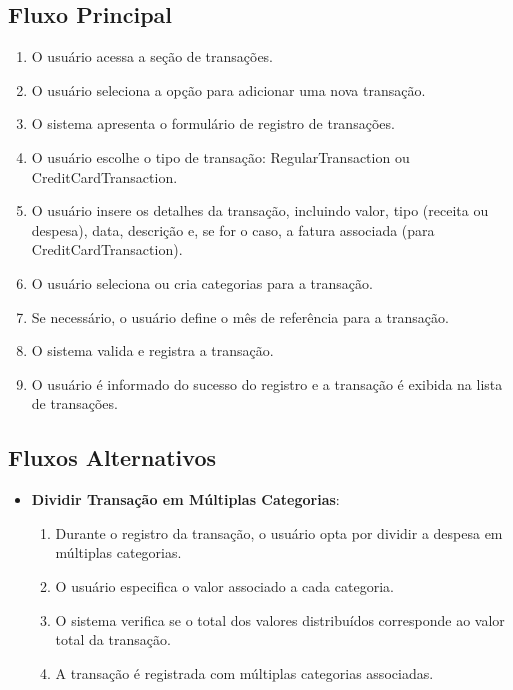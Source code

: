 \subsection*{Fluxo Principal}
\begin{addmargin}[1.5cm]{0cm}
	\begin{enumerate}
		\item O usuário acessa a seção de transações.
		\item O usuário seleciona a opção para adicionar uma nova transação.
		\item O sistema apresenta o formulário de registro de transações.
		\item O usuário escolhe o tipo de transação: RegularTransaction ou CreditCardTransaction.
		\item O usuário insere os detalhes da transação, incluindo valor, tipo (receita ou despesa), data, descrição e, se for o caso, a fatura associada (para CreditCardTransaction).
		\item O usuário seleciona ou cria categorias para a transação.
		\item Se necessário, o usuário define o mês de referência para a transação.
		\item O sistema valida e registra a transação.
		\item O usuário é informado do sucesso do registro e a transação é exibida na lista de transações.
	\end{enumerate}
\end{addmargin}

\subsection*{Fluxos Alternativos}
\begin{addmargin}[1.5cm]{0cm}
	\begin{itemize}
		\item \textbf{Dividir Transação em Múltiplas Categorias}:
		      \begin{enumerate}
			      \item Durante o registro da transação, o usuário opta por dividir a despesa em múltiplas categorias.
			      \item O usuário especifica o valor associado a cada categoria.
			      \item O sistema verifica se o total dos valores distribuídos corresponde ao valor total da transação.
			      \item A transação é registrada com múltiplas categorias associadas.
		      \end{enumerate}
	\end{itemize}
\end{addmargin}

